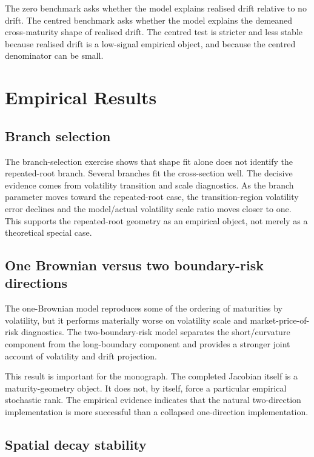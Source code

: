 \documentclass[11pt,oneside]{book}
\begin{document}
The zero benchmark asks whether the model explains realised drift relative to no drift. The centred benchmark asks whether the model explains the demeaned cross-maturity shape of realised drift. The centred test is stricter and less stable because realised drift is a low-signal empirical object, and because the centred denominator can be small.

\section{Empirical Results}

\subsection{Branch selection}

The branch-selection exercise shows that shape fit alone does not identify the repeated-root branch. Several branches fit the cross-section well. The decisive evidence comes from volatility transition and scale diagnostics. As the branch parameter moves toward the repeated-root case, the transition-region volatility error declines and the model/actual volatility scale ratio moves closer to one. This supports the repeated-root geometry as an empirical object, not merely as a theoretical special case.

\subsection{One Brownian versus two boundary-risk directions}

The one-Brownian model reproduces some of the ordering of maturities by volatility, but it performs materially worse on volatility scale and market-price-of-risk diagnostics. The two-boundary-risk model separates the short/curvature component from the long-boundary component and provides a stronger joint account of volatility and drift projection.

This result is important for the monograph. The completed Jacobian itself is a maturity-geometry object. It does not, by itself, force a particular empirical stochastic rank. The empirical evidence indicates that the natural two-direction implementation is more successful than a collapsed one-direction implementation.

\subsection{Spatial decay stability}
\end{document}
